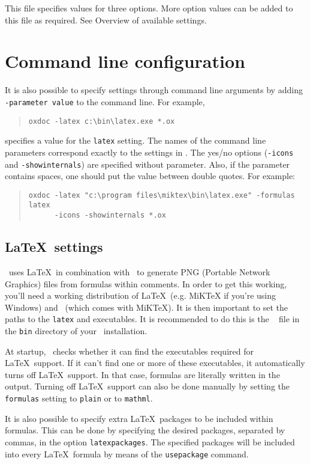 This file specifies values for three options. More option values can be added to
this file as required. See Overview of available settings.

\section{Command line configuration}
It is also possible to specify settings through command line arguments
by adding {\tt -parameter value} to the command line. 
For example,
\begin{quote}
\small\begin{verbatim}
oxdoc -latex c:\bin\latex.exe *.ox
\end{verbatim}
\end{quote}
specifies a value for the {\tt latex} setting. The names of the
command line parameters correspond exactly to the settings in 
\oxdocxml. The yes/no options ({\tt -icons} and {\tt -showinternals})
are specified without parameter. Also, if the parameter contains spaces,
one should put the value between double quotes. For example:
\begin{quote}
\small\begin{verbatim}
oxdoc -latex "c:\program files\miktex\bin\latex.exe" -formulas latex 
      -icons -showinternals *.ox
\end{verbatim}
\end{quote}

\subsection{\LaTeX~settings}
\oxdoc~uses \LaTeX~in combination with \dvipng~to generate PNG
(Portable Network Graphics) files from formulas within comments. In order to get this
working, you'll need a working distribution of \LaTeX~(e.g. MiKTeX
if you're using Windows) and \dvipng~(which comes with MiKTeX). It is then important
to set the paths to the {\tt latex} and \dvipng executables. It is recommended to do this is the \oxdocxml~
file in the {\tt bin} directory of your \oxdoc~installation.

At startup, \oxdoc~checks whether it can find the executables required for \LaTeX~support. If
it can't find one or more of these executables, it automatically turns off \LaTeX~support. In that case,
formulas are literally written in the output. Turning off \LaTeX~support can also be done manually by
setting the {\tt formulas} setting to {\tt plain} or to {\tt mathml}.

It is also possible to specify extra \LaTeX~packages to be included within formulas. This can be done
by specifying the desired packages, separated by commas, in the option {\tt latexpackages}.
The specified packages will be included into every \LaTeX~formula by means of the {\tt \bs usepackage}
command.



